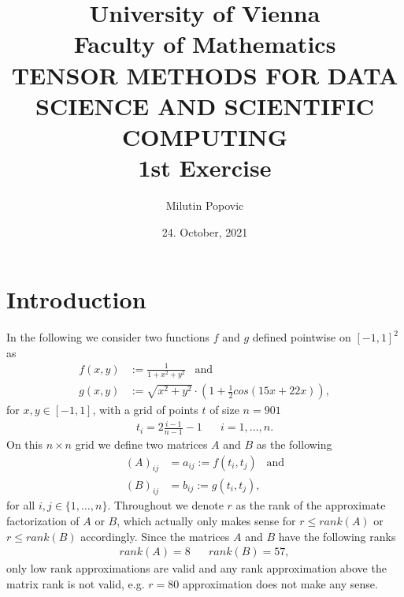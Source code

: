 \documentclass[a4paper]{article}
\title{University of Vienna\\ Faculty of Mathematics\\
\vspace{1cm}TENSOR METHODS FOR DATA SCIENCE AND SCIENTIFIC COMPUTING \\ 1st
Exercise
}
\author{Milutin Popovic}
\date{24. October, 2021}
\begin{document}
\maketitle
\tableofcontents

\section{Introduction}
In the following we consider two functions $f$ and $g$ defined pointwise on
$[-1, 1]^2$ as
\begin{align}
    f(x, y) &:= \frac{1}{1+x^2+y^2} \;\;\; \text{and}\\
    g(x, y) &:= \sqrt{x^2+y^2}\cdot\left(1+\frac{1}{2}cos(15x + 22x)\right),
\end{align}
for $x, y \in [-1, 1]$, with a grid of points $t$ of size $n=901$
\begin{align}
    t_i = 2\frac{i-1}{n-1}-1 \;\;\;\;\;\; i=1,\dots,n.
\end{align}
On this $n\times n$ grid we define two matrices $A$ and $B$ as the following
\begin{align}
    (A)_{ij} &= a_{ij} := f(t_i, t_j)\;\;\; \text{and}\\
    (B)_{ij} &= b_{ij} := g(t_i, t_j),
\end{align}
for all $i, j \in \{1,\dots, n\}$. Throughout we denote $r$ as the rank of the
approximate factorization of $A$ or $B$, which actually only makes sense for
$r \leq rank(A)$ or $r \leq rank(B)$ accordingly. Since the matrices $A$ and
$B$ have the following ranks
\begin{align}
    rank(A) = 8 \;\;\;\;\;\; rank(B) = 57,
\end{align}
only low rank approximations are valid and any rank approximation above the
matrix rank is not valid, e.g. $r=80$ approximation does not make any sense.
\end{document}
